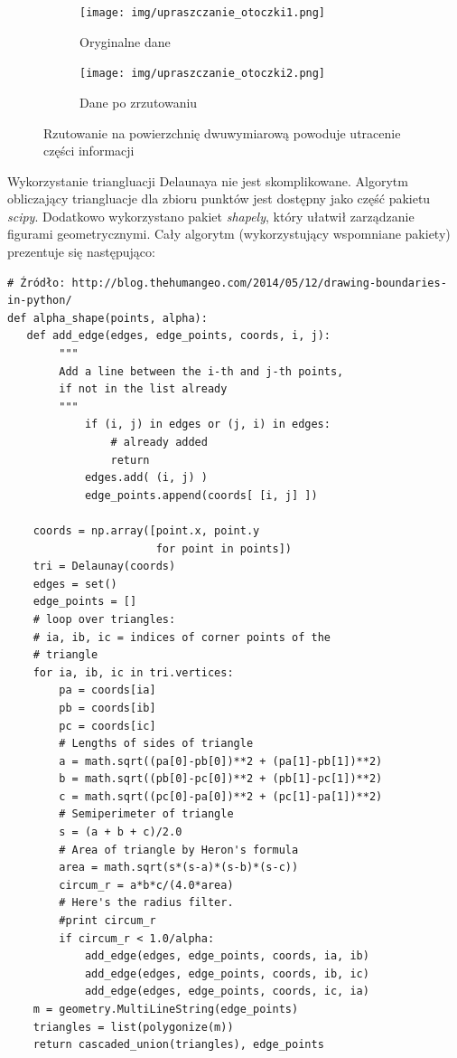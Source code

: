 \begin{figure}[h!]
    \centering
    \begin{subfigure}[b]{0.3\textwidth}
        \texttt{[image: img/upraszczanie\_otoczki1.png]}
        \caption {Oryginalne dane}
    \end{subfigure}
    \quad
    \begin{subfigure}[b]{0.3\textwidth}
        \texttt{[image: img/upraszczanie\_otoczki2.png]}
        \caption {Dane po zrzutowaniu}
    \end{subfigure}%
    \caption{Rzutowanie na powierzchnię dwuwymiarową powoduje utracenie części informacji}
    \label{fig:upraszczanie_otoczki}
\end{figure}

Wykorzystanie triangluacji Delaunaya nie jest skomplikowane. Algorytm obliczający triangluacje
dla zbioru punktów jest dostępny jako część pakietu \textit{scipy}. Dodatkowo wykorzystano pakiet \textit{shapely},
który ułatwił zarządzanie figurami geometrycznymi. Cały algorytm (wykorzystujący wspomniane pakiety)
prezentuje się następująco:

\begin{lstlisting}
# Źródło: http://blog.thehumangeo.com/2014/05/12/drawing-boundaries-in-python/
def alpha_shape(points, alpha):
   def add_edge(edges, edge_points, coords, i, j):
        """
        Add a line between the i-th and j-th points,
        if not in the list already
        """
            if (i, j) in edges or (j, i) in edges:
                # already added
                return
            edges.add( (i, j) )
            edge_points.append(coords[ [i, j] ])

    coords = np.array([point.x, point.y
                       for point in points])
    tri = Delaunay(coords)
    edges = set()
    edge_points = []
    # loop over triangles:
    # ia, ib, ic = indices of corner points of the
    # triangle
    for ia, ib, ic in tri.vertices:
        pa = coords[ia]
        pb = coords[ib]
        pc = coords[ic]
        # Lengths of sides of triangle
        a = math.sqrt((pa[0]-pb[0])**2 + (pa[1]-pb[1])**2)
        b = math.sqrt((pb[0]-pc[0])**2 + (pb[1]-pc[1])**2)
        c = math.sqrt((pc[0]-pa[0])**2 + (pc[1]-pa[1])**2)
        # Semiperimeter of triangle
        s = (a + b + c)/2.0
        # Area of triangle by Heron's formula
        area = math.sqrt(s*(s-a)*(s-b)*(s-c))
        circum_r = a*b*c/(4.0*area)
        # Here's the radius filter.
        #print circum_r
        if circum_r < 1.0/alpha:
            add_edge(edges, edge_points, coords, ia, ib)
            add_edge(edges, edge_points, coords, ib, ic)
            add_edge(edges, edge_points, coords, ic, ia)
    m = geometry.MultiLineString(edge_points)
    triangles = list(polygonize(m))
    return cascaded_union(triangles), edge_points 
\end{lstlisting}

